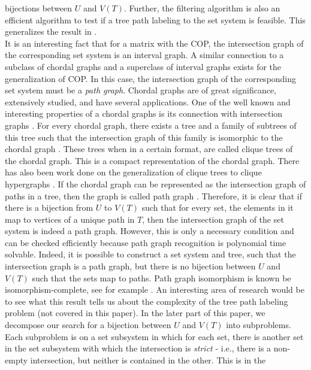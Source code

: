\documentclass[a4paper,UKenglish,numberwithinsect]{lipics} %
\begin{document}
bijections between $U$ and $V(T)$.  Further, the filtering algorithm
is also an efficient algorithm to test if a tree path labeling to the
set system is feasible.  This
generalizes the result in \cite{nsnrs09}.\\
\noindent
It is an interesting fact that for a matrix with the COP, the
intersection graph of the corresponding set system is an interval
graph.  A similar connection to a subclass of chordal graphs and a
superclass of interval graphs exists for the generalization of COP.
In this case, the intersection graph of the corresponding set system
must be a {\em path graph}. Chordal graphs are of great significance,
extensively studied, and have several applications.  One of the well
known and interesting properties of a chordal graphs is its connection
with intersection graphs \cite{mcg04}. For every chordal graph, there
exists a tree and a family of subtrees of this tree such that the
intersection graph of this family is isomorphic to the chordal graph
\cite{plr70,gav78,bp93}.  These trees when in a certain format, are
called clique trees \cite{apy92} of the chordal graph. This is a
compact representation of the chordal graph. There has also been work
done on the generalization of clique trees to clique hypergraphs
\cite{km02}.  If the chordal graph can be represented as the
intersection graph of paths in a tree, then the graph is called path
graph \cite{mcg04}.  Therefore, it is clear that if there is a
bijection from $U$ to $V(T)$ such that for every set, the elements in
it map to vertices of a unique path in $T$, then the intersection
graph of the set system is indeed a path graph.  However, this is only
a necessary condition and can be checked efficiently because path
graph recognition is polynomial time
solvable\cite{gav78,aas93}. Indeed, it is possible to construct a set
system and tree, such that the intersection graph is a path graph, but
there is no bijection between $U$ and $V(T)$ such that the sets map to
paths. Path graph isomorphism is known be isomorphism-complete, see
for example \cite{kklv10}. An interesting area of research would be to
see what this result tells us about the complexity of the tree path
labeling problem (not covered in this paper). In the later part of
this paper, we decompose our search for a bijection between $U$ and
$V(T)$ into subproblems.  Each subproblem is on a set subsystem in
which for each set, there is another set in the set subsystem with
which the intersection is {\em strict} - i.e., there is a non-empty
intersection, but neither is contained in the other.  This is in the
\end{document}

